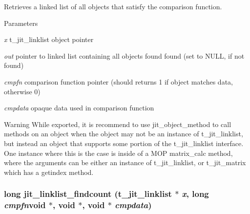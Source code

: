 Retrieves a linked list of all objects that satisfy the comparison function. 
\begin{DoxyParams}{Parameters}
\item[{\em x}]t\_\-jit\_\-linklist object pointer \item[{\em out}]pointer to linked list containing all objects found found (set to NULL, if not found) \item[{\em cmpfn}]comparison function pointer (should returns 1 if object matches data, otherwise 0) \item[{\em cmpdata}]opaque data used in comparison function\end{DoxyParams}
\begin{DoxyWarning}{Warning}
While exported, it is recommend to use jit\_\-object\_\-method to call methods on an object when the object may not be an instance of t\_\-jit\_\-linklist, but instead an object that supports some portion of the t\_\-jit\_\-linklist interface. One instance where this is the case is inside of a MOP matrix\_\-calc method, where the arguments can be either an instance of t\_\-jit\_\-linklist, or t\_\-jit\_\-matrix which has a getindex method. 
\end{DoxyWarning}
\hypertarget{group__linklistmod_gad09f6bfef859b63516a2c54a347250f8}{
\subsubsection[{jit\_\-linklist\_\-findcount}]{\setlength{\rightskip}{0pt plus 5cm}long jit\_\-linklist\_\-findcount (t\_\-jit\_\-linklist $\ast$ {\em x}, \/  long  {\em cmpfn}void $\ast$, void $\ast$, \/  void $\ast$ {\em cmpdata})}}
\label{group__linklistmod_gad09f6bfef859b63516a2c54a347250f8}


